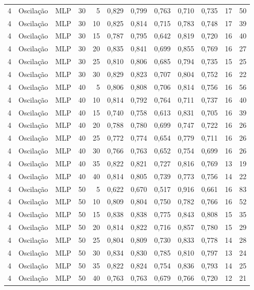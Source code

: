 \begin{longtable}{@{}rllrrrrrrrrr@{}}
4 & Oscilação & MLP & 30 & 5 & 0,829 & 0,799 & 0,763 & 0,710 & 0,735 & 17 & 50 \\
4 & Oscilação & MLP & 30 & 10 & 0,825 & 0,814 & 0,715 & 0,783 & 0,748 & 17 & 39 \\
4 & Oscilação & MLP & 30 & 15 & 0,787 & 0,795 & 0,642 & 0,819 & 0,720 & 16 & 40 \\
4 & Oscilação & MLP & 30 & 20 & 0,835 & 0,841 & 0,699 & 0,855 & 0,769 & 16 & 27 \\
4 & Oscilação & MLP & 30 & 25 & 0,810 & 0,806 & 0,685 & 0,794 & 0,735 & 15 & 25 \\
4 & Oscilação & MLP & 30 & 30 & 0,829 & 0,823 & 0,707 & 0,804 & 0,752 & 16 & 22 \\
4 & Oscilação & MLP & 40 & 5 & 0,806 & 0,808 & 0,706 & 0,814 & 0,756 & 16 & 56 \\
4 & Oscilação & MLP & 40 & 10 & 0,814 & 0,792 & 0,764 & 0,711 & 0,737 & 16 & 40 \\
4 & Oscilação & MLP & 40 & 15 & 0,740 & 0,758 & 0,613 & 0,831 & 0,705 & 16 & 39 \\
4 & Oscilação & MLP & 40 & 20 & 0,788 & 0,780 & 0,699 & 0,747 & 0,722 & 16 & 26 \\
4 & Oscilação & MLP & 40 & 25 & 0,772 & 0,774 & 0,654 & 0,779 & 0,711 & 16 & 26 \\
4 & Oscilação & MLP & 40 & 30 & 0,766 & 0,763 & 0,652 & 0,754 & 0,699 & 16 & 26 \\
4 & Oscilação & MLP & 40 & 35 & 0,822 & 0,821 & 0,727 & 0,816 & 0,769 & 13 & 19 \\
4 & Oscilação & MLP & 40 & 40 & 0,814 & 0,805 & 0,739 & 0,773 & 0,756 & 14 & 22 \\
4 & Oscilação & MLP & 50 & 5 & 0,622 & 0,670 & 0,517 & 0,916 & 0,661 & 16 & 83 \\
4 & Oscilação & MLP & 50 & 10 & 0,809 & 0,804 & 0,750 & 0,782 & 0,766 & 16 & 52 \\
4 & Oscilação & MLP & 50 & 15 & 0,838 & 0,838 & 0,775 & 0,843 & 0,808 & 15 & 35 \\
4 & Oscilação & MLP & 50 & 20 & 0,814 & 0,822 & 0,716 & 0,857 & 0,780 & 15 & 29 \\
4 & Oscilação & MLP & 50 & 25 & 0,804 & 0,809 & 0,730 & 0,833 & 0,778 & 14 & 28 \\
4 & Oscilação & MLP & 50 & 30 & 0,834 & 0,830 & 0,785 & 0,810 & 0,797 & 13 & 24 \\
4 & Oscilação & MLP & 50 & 35 & 0,822 & 0,824 & 0,754 & 0,836 & 0,793 & 14 & 25 \\
4 & Oscilação & MLP & 50 & 40 & 0,763 & 0,763 & 0,679 & 0,766 & 0,720 & 12 & 21 \\

\end{longtable}
